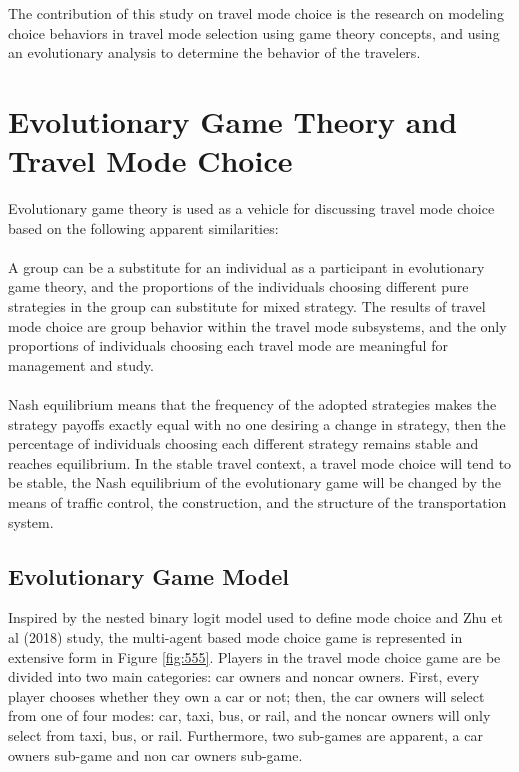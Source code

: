 
The contribution of this study on travel mode choice is the research on modeling choice behaviors in travel mode selection using game theory concepts, and using an evolutionary analysis to determine the behavior of the travelers.
\clearpage

\section{Evolutionary Game Theory and Travel Mode Choice}
Evolutionary game theory is used as a vehicle for discussing travel mode choice based on the following apparent similarities: 
\paragraph{}A group can be a substitute for an individual as a participant in evolutionary game theory, and the proportions of the individuals choosing different pure strategies in the group can substitute for mixed strategy. The results of travel mode choice are group behavior within the travel mode subsystems, and the only proportions of individuals choosing each travel mode are meaningful for management and study.
\paragraph{}Nash equilibrium means that the frequency of the adopted strategies makes the strategy payoffs exactly equal with no one desiring a change in strategy, then the percentage of individuals choosing each different strategy remains stable and reaches equilibrium. In the stable travel context, a travel mode choice will tend to be stable, the Nash equilibrium of the evolutionary game will be changed by the means of traffic control, the construction, and the structure of the transportation system.

\subsection{Evolutionary Game Model}

Inspired by the nested binary logit model used to define mode choice and Zhu et al (2018) study, the multi-agent based mode choice game is represented in extensive form in Figure \ref{fig:555}.
Players in the travel mode choice game are be divided into two main categories: car owners and noncar owners. First, every player chooses whether they own a car or not; then, the car owners will select from one of four modes: car, taxi, bus, or rail, and the noncar owners will only select from taxi, bus, or rail. Furthermore, two sub-games are apparent, a car owners sub-game and non car owners sub-game.

